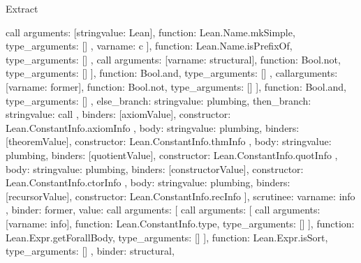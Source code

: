 \begin{lexlean}{Extract}
\begin{toolingmodule}
{{{{{{{{{{                              call{
                                arguments: [string{value: Lean}],
                                function: Lean.Name.mkSimple,
                                type_arguments: []
                              },
                              var{name: c}
                            ],
                            function: Lean.Name.isPrefixOf,
                            type_arguments: []
                          },
                          call{
                            arguments: [var{name: structural}],
                            function: Bool.not,
                            type_arguments: []
                          }
                        ],
                        function: Bool.and,
                        type_arguments: []
                      },
                      call{arguments: [var{name: former}], function: Bool.not, type_arguments: []}
                    ],
                    function: Bool.and,
                    type_arguments: []
                  },
                  else_branch: string{value: plumbing},
                  then_branch: string{value: call}
                },
                binders: [axiomValue],
                constructor: Lean.ConstantInfo.axiomInfo
              },
              {
                body: string{value: plumbing},
                binders: [theoremValue],
                constructor: Lean.ConstantInfo.thmInfo
              },
              {
                body: string{value: plumbing},
                binders: [quotientValue],
                constructor: Lean.ConstantInfo.quotInfo
              },
              {
                body: string{value: plumbing},
                binders: [constructorValue],
                constructor: Lean.ConstantInfo.ctorInfo
              },
              {
                body: string{value: plumbing},
                binders: [recursorValue],
                constructor: Lean.ConstantInfo.recInfo
              }
            ],
            scrutinee: var{name: info}
          },
          binder: former,
          value: call{
            arguments: [
              call{
                arguments: [
                  call{
                    arguments: [var{name: info}],
                    function: Lean.ConstantInfo.type,
                    type_arguments: []
                  }
                ],
                function: Lean.Expr.getForallBody,
                type_arguments: []
              }
            ],
            function: Lean.Expr.isSort,
            type_arguments: []
          }
        },
        binder: structural,
}}}
\end{toolingmodule}
\end{lexlean}
